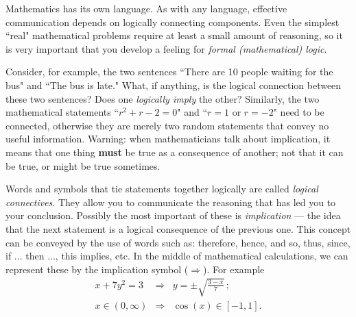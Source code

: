%
%
%
%
%



\setcounter{equation}{0}

Mathematics has its own language.  As with any language, effective
communication depends on logically connecting components.  Even the
simplest ``real" mathematical problems require at least a small amount
of reasoning, so it is very important that you develop a feeling for
{\em formal (mathematical) logic}.

Consider, for example, the two sentences ``There are 10 people waiting
for the bus" and ``The bus
is late."  What, if anything, is the logical connection between these two
sentences?  Does one {\em logically imply} the other?
Similarly, the two mathematical statements ``$r^2 + r - 2 = 0$" and
``$r=1$ or $r=-2$" need to be connected, otherwise they are merely two
random statements that convey no useful information.
  Warning: when
mathematicians talk about implication, it means that one thing {\bf must}
be true as a consequence of another; not that it can be true, or
might be true sometimes.  

Words and symbols that tie statements together logically are called
{\em logical connectives}.  They allow you to communicate the reasoning
that has led you to your conclusion.  Possibly the most important of
these is {\em implication} --- the idea that the next statement is a
logical consequence of the previous one.  This concept can be conveyed by
the use of words such as: therefore, hence, and so, thus, since, if $\dots$
then $\dots$, this implies, etc.  In the middle of mathematical calculations, we
can represent these by the implication symbol ($\Rightarrow$).
   For example
\begin{eqnarray}
x + 7y^2 = 3 & \Rightarrow & y = \pm \sqrt{\frac{3-x}{7}} \, ; \label{first} \\
x \in (0,\infty) & \Rightarrow & \cos(x) \in [-1,1]. \label{second}
\end{eqnarray}

